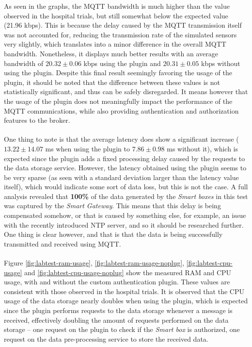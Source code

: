 As seen in the graphs, the \acs{MQTT} bandwidth is much higher than the value observed in the hospital trials, but still somewhat below the expected value (21.96 kbps). 
This is because the delay caused by the \acs{MQTT} transmission itself was not accounted for, reducing the transmission rate of the simulated sensors very slightly, which translates into a minor difference in the overall \acs{MQTT} bandwidth. Nonetheless, it displays much better results with an average bandwidth of $20.32 \pm 0.06$ kbps using the plugin and $20.31 \pm 0.05$ kbps without using the plugin. Despite this final result seemingly favoring the usage of the plugin, it should be noted that the difference between these values is not statistically significant, and thus can be safely disregarded. It means however that the usage of the plugin does not meaningfully impact the performance of the \acs{MQTT} communications, while also providing authentication and authorization features to the broker.

\paragraph{} One thing to note is that the average latency does show a significant increase ($13.22 \pm 14.07$ ms when using the plugin to $7.86 \pm 0.98$ ms without it), which is expected since the plugin adds a fixed processing delay caused by the requests to the data storage service. However, the latency obtained using the plugin seems to be very sparse (as seen with a standard deviation larger than the latency value itself), which would indicate some sort of data loss, but this is not the case. A full analysis revealed that \textbf{100\%} of the data generated by the \textit{Smart boxes} in this test was captured by the \textit{Smart Gateway}. This means that this delay is being compensated somehow, or that is caused by something else, for example, an issue with the recently introduced \acs{NTP} server, and so it should be researched further. One thing is clear however, and that is that the data is being successfully transmitted and received using \acs{MQTT}. 

\paragraph{} Figure \ref{fig:labtest-ram-usage}, \ref{fig:labtest-ram-usage-noplug}, \ref{fig:labtest-cpu-usage} and \ref{fig:labtest-cpu-usage-noplug} show the measured \acs{RAM} and \acs{CPU} usage, with and without the custom authentication plugin. These values are consistent with those observed in the hospital trials. It is observed that the \acs{CPU} usage of the data storage nearly doubles when using the plugin, which is expected since the plugin performs requests to the data storage whenever a message is received, effectively doubling the amount of requests performed on the data storage -- one request on the plugin to check if the \textit{Smart box} is authorized, one request on the data pre-processing service to store the received data.

